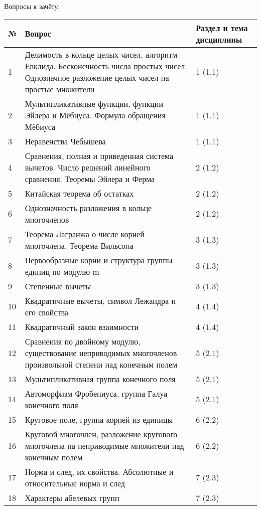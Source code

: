 \documentclass[a4paper, 12pt]{article}
\begin{document}
Вопросы к зачёту:

\noindent
\begin{longtable}{ | p{0.8cm} | p{11cm} | p{2cm} | } 
    \hline
    \bf № & \textbf{Вопрос} & \textbf{Раздел и тема дисциплины} \\
    \hline
    \hline
    \endhead
    1 & Делимость в кольце целых чисел, алгоритм Евклида. Бесконечность числа простых чисел. Однозначное разложение целых чисел на простые множители & 1 (1.1) \\ \hline
    2 & Мультипликативные функции, функции Эйлера и Мёбиуса. Формула обращения Мёбиуса & 1 (1.1) \\ \hline
    3 & Неравенства Чебышева & 1 (1.1) \\ \hline
    4 & Сравнения, полная и приведенная система вычетов. Число решений линейного сравнения. Теоремы Эйлера и Ферма & 2 (1.2) \\ \hline
    5 & Китайская теорема об остатках & 2 (1.2) \\ \hline
    6 & Однозначность разложения в кольце многочленов & 2 (1.2) \\ \hline
    7 & Теорема Лагранжа о числе корней многочлена. Теорема Вильсона & 3 (1.3) \\ \hline
    8 & Первообразные корни и структура группы единиц по модулю m & 3 (1.3) \\ \hline
    9 & Степенные вычеты & 3 (1.3) \\ \hline
    10 & Квадратичные вычеты, символ Лежандра и его свойства & 4 (1.4) \\ \hline
    11 & Квадратичный закон взаимности & 4 (1.4) \\ \hline
    12 & Сравнения по двойному модулю, существование неприводимых многочленов произвольной степени над конечным полем & 5 (2.1) \\ \hline
    13 & Мультипликативная группа конечного поля & 5 (2.1) \\ \hline
    14 & Автоморфизм Фробениуса, группа Галуа конечного поля & 5 (2.1) \\ \hline
    15 & Круговое поле, группа корней из единицы & 6 (2.2) \\ \hline
    16 & Круговой многочлен, разложение кругового многочлена на неприводимые множители над конечным полем & 6 (2.2) \\ \hline
    17 & Норма и след, их свойства. Абсолютные и относительные норма и след & 7 (2.3) \\ \hline
    18 & Характеры абелевых групп & 7 (2.3) \\ \hline

\end{longtable}
\end{document}
